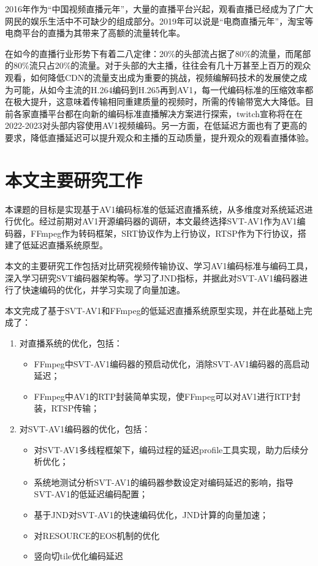 2016年作为“中国视频直播元年”，大量的直播平台兴起，观看直播已经成为了广大网民的娱乐生活中不可缺少的组成部分。2019年可以说是“电商直播元年”，淘宝等电商平台的直播为其带来了高额的流量转化率。

在如今的直播行业形势下有着二八定律：20\%的头部流占据了80\%的流量，而尾部的80\%流只占20\%的流量。对于头部的大主播，往往会有几十万甚至上百万的观众观看，如何降低CDN的流量支出成为重要的挑战，视频编解码技术的发展使之成为可能，从如今主流的H.264编码到H.265再到AV1，每一代编码标准的压缩效率都在极大提升，这意味着传输相同重建质量的视频时，所需的传输带宽大大降低。目前各家直播平台都在向新的编码标准直播解决方案进行探索，twitch宣称将在在2022-2023对头部内容使用AV1视频编码\cite{yueshiTwitchTalksVP92019}。另一方面，在低延迟方面也有了更高的要求，降低直播延迟可以提升观众和主播的互动质量，提升观众的观看直播体验。

\section{本文主要研究工作}


本课题的目标是实现基于AV1编码标准的低延迟直播系统，从多维度对系统延迟进行优化。经过前期对AV1开源编码器的调研，本文最终选择SVT-AV1作为AV1编码器，FFmpeg作为转码框架，SRT协议作为上行协议，RTSP作为下行协议，搭建了低延迟直播系统原型。

本文的主要研究工作包括对比研究视频传输协议、学习AV1编码标准与编码工具，深入学习研究SVT编码器架构等。学习了JND指标，并据此对SVT-AV1编码器进行了快速编码的优化，并学习实现了向量加速。

本文完成了基于SVT-AV1和FFmpeg的低延迟直播系统原型实现，并在此基础上完成了：
\begin{enumerate} [label=\arabic*)]
    \item 对直播系统的优化，包括：
        \begin{itemize}
            \item FFmpeg中SVT-AV1编码器的预启动优化，消除SVT-AV1编码器的高启动延迟；
            \item FFmpeg中AV1的RTP封装简单实现，使FFmpeg可以对AV1进行RTP封装，RTSP传输；
        \end{itemize}
    \item 对SVT-AV1编码器的优化，包括：
        \begin{itemize}
            \item 对SVT-AV1多线程框架下，编码过程的延迟profile工具实现，助力后续分析优化；
            \item 系统地测试分析SVT-AV1的编码器参数设定对编码延迟的影响，指导SVT-AV1的低延迟编码配置；
            \item 基于JND对SVT-AV1的快速编码优化，JND计算的向量加速；
            \item 对RESOURCE的EOS机制的优化
            \item 竖向切tile优化编码延迟
        \end{itemize}
\end{enumerate}

